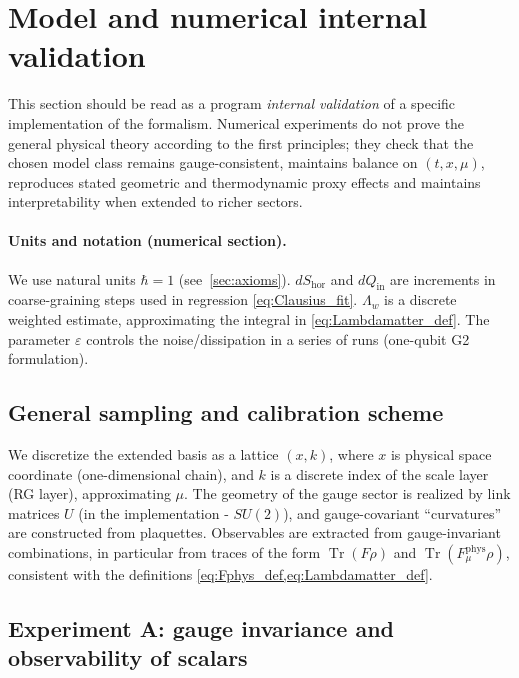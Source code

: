 \documentclass[11pt,a4paper]{article}
\DeclareMathOperator{\Tr}{Tr}
\theoremstyle{definition}
\theoremstyle{plain}
\theoremstyle{remark}
\begin{document}
\section{Model and numerical internal validation}
\label{sec:numerics}

This section should be read as a program \emph{internal validation} of a specific implementation of the formalism.
Numerical experiments do not prove the general physical theory according to the first principles;
they check that the chosen model class remains gauge-consistent,
maintains balance on $(t,x,\mu)$, reproduces stated geometric and thermodynamic proxy effects
and maintains interpretability when extended to richer sectors.

\paragraph{Units and notation (numerical section).}
We use natural units $\hbar=1$ (see\ \cref{sec:axioms}).
$dS_{\mathrm{hor}}$ and $dQ_{\mathrm{in}}$ are increments in coarse-graining steps used in regression \cref{eq:Clausius_fit}.
$\Lambda_w$ is a discrete weighted estimate, approximating the integral in \cref{eq:Lambdamatter_def}.
The parameter $\varepsilon$ controls the noise/dissipation in a series of runs (one-qubit G2 formulation).

\subsection{General sampling and calibration scheme}
\label{sec:numerics:setup}

We discretize the extended basis as a lattice $(x,k)$, where $x$ is physical space coordinate
(one-dimensional chain), and $k$ is a discrete index of the scale layer (RG layer), approximating $\mu$.
The geometry of the gauge sector is realized by link matrices $U$ (in the implementation - $SU(2)$),
and gauge-covariant “curvatures” are constructed from plaquettes.
Observables are extracted from gauge-invariant combinations, in particular from traces of the form
$\Tr(F\rho)$ and $\Tr(F^{\mathrm{phys}}_\mu\rho)$, consistent with the definitions \cref{eq:Fphys_def,eq:Lambdamatter_def}.

\subsection{Experiment A: gauge invariance and observability of scalars}
\label{sec:numerics:A}
\end{document}
